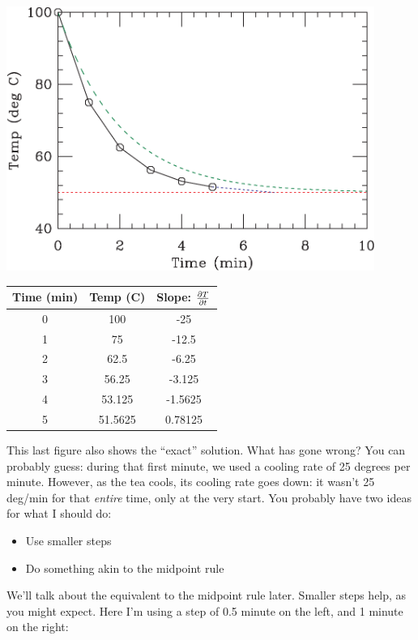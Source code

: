 \documentclass[12ampt]{article}
\def\PAR#1#2{ {{\partial #1}\over{\partial #2}} }
\begin{document}
\begin{minipage}{0.5\textwidth}
\includegraphics[width=0.9\textwidth]{fig5-crop.pdf}
\end{minipage}
\begin{minipage}{0.5\textwidth}
\begin{tabular}{|c | c | c |}
\hline
Time (min) & Temp (C) & Slope: $\PAR{T}{t}$ \\
\hline
0 & 100 & -25 \\
\hline
1 & 75 &  -12.5\\
\hline
2 & 62.5 & -6.25  \\
\hline
3 & 56.25 & -3.125 \\
\hline
4 & 53.125& -1.5625 \\
\hline
5 & 51.5625& 0.78125 \\
\hline
\end{tabular}
\end{minipage}

This last figure also shows the ``exact'' solution. What has gone wrong? You can
probably guess: during that first minute, we used a cooling rate of 25 degrees
per minute. However, as the tea cools, its cooling rate goes down: it wasn't 
25 deg/min for that {\it entire} time, only at the very start. You probably
have two ideas for what I should do:

\begin{itemize}
\item Use smaller steps
\item Do something akin to the midpoint rule
\end{itemize}

We'll talk about the equivalent to the midpoint rule later. Smaller steps help, as
you might expect. Here I'm using a step of 0.5 minute on the left, 
and 1 minute on the right:
\end{document}
